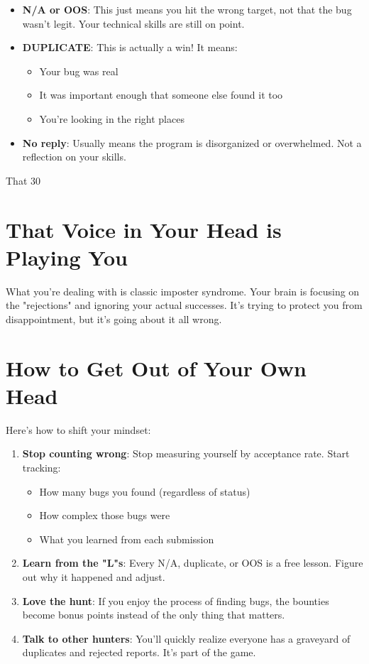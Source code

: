 \documentclass[11pt]{article}
\begin{document}
\begin{itemize}
\item \textbf{N/A or OOS}: This just means you hit the wrong target, not that the bug wasn't legit. Your technical skills are still on point.

\item \textbf{DUPLICATE}: This is actually a win! It means:
  \begin{itemize}
  \item Your bug was real
  \item It was important enough that someone else found it too
  \item You're looking in the right places
  \end{itemize}

\item \textbf{No reply}: Usually means the program is disorganized or overwhelmed. Not a reflection on your skills.
\end{itemize}

That 30%

\section{That Voice in Your Head is Playing You}

What you're dealing with is classic imposter syndrome. Your brain is focusing on the "rejections" and ignoring your actual successes. It's trying to protect you from disappointment, but it's going about it all wrong.

\section{How to Get Out of Your Own Head}

Here's how to shift your mindset:

\begin{enumerate}
\item \textbf{Stop counting wrong}: Stop measuring yourself by acceptance rate. Start tracking:
  \begin{itemize}
  \item How many bugs you found (regardless of status)
  \item How complex those bugs were
  \item What you learned from each submission
  \end{itemize}

\item \textbf{Learn from the "L"s}: Every N/A, duplicate, or OOS is a free lesson. Figure out why it happened and adjust.

\item \textbf{Love the hunt}: If you enjoy the process of finding bugs, the bounties become bonus points instead of the only thing that matters.

\item \textbf{Talk to other hunters}: You'll quickly realize everyone has a graveyard of duplicates and rejected reports. It's part of the game.
\end{enumerate}
\end{document}
